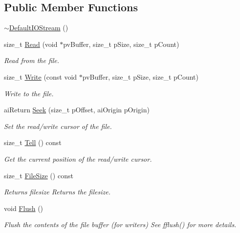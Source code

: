 \subsection*{Public Member Functions}
\begin{DoxyCompactItemize}
\item 
\hyperlink{class_assimp_1_1_default_i_o_stream_a650bf2643dd6e8bec2dea5d42d3dad87}{$\sim$\+Default\+I\+O\+Stream} ()
\item 
size\+\_\+t \hyperlink{class_assimp_1_1_default_i_o_stream_a155183c2c2ecc4d89a87acd0b8b4e9f6}{Read} (void $\ast$pv\+Buffer, size\+\_\+t p\+Size, size\+\_\+t p\+Count)
\begin{DoxyCompactList}\small\item\em Read from the file. \end{DoxyCompactList}\item 
size\+\_\+t \hyperlink{class_assimp_1_1_default_i_o_stream_aea9db55f57be5258d92fe7bf9a4e2023}{Write} (const void $\ast$pv\+Buffer, size\+\_\+t p\+Size, size\+\_\+t p\+Count)
\begin{DoxyCompactList}\small\item\em Write to the file. \end{DoxyCompactList}\item 
ai\+Return \hyperlink{class_assimp_1_1_default_i_o_stream_af00a478e5acde375ae048ac3a02fb856}{Seek} (size\+\_\+t p\+Offset, ai\+Origin p\+Origin)
\begin{DoxyCompactList}\small\item\em Set the read/write cursor of the file. \end{DoxyCompactList}\item 
size\+\_\+t \hyperlink{class_assimp_1_1_default_i_o_stream_a2be680b7e4b6d69f9838c8ddd0089913}{Tell} () const 
\begin{DoxyCompactList}\small\item\em Get the current position of the read/write cursor. \end{DoxyCompactList}\item 
\hypertarget{class_assimp_1_1_default_i_o_stream_a6613194345241f27157ef48230b8cf6a}{size\+\_\+t \hyperlink{class_assimp_1_1_default_i_o_stream_a6613194345241f27157ef48230b8cf6a}{File\+Size} () const }\label{class_assimp_1_1_default_i_o_stream_a6613194345241f27157ef48230b8cf6a}

\begin{DoxyCompactList}\small\item\em Returns filesize Returns the filesize. \end{DoxyCompactList}\item 
\hypertarget{class_assimp_1_1_default_i_o_stream_a8f5820f1157b5906b8f3a272616d7dda}{void \hyperlink{class_assimp_1_1_default_i_o_stream_a8f5820f1157b5906b8f3a272616d7dda}{Flush} ()}\label{class_assimp_1_1_default_i_o_stream_a8f5820f1157b5906b8f3a272616d7dda}

\begin{DoxyCompactList}\small\item\em Flush the contents of the file buffer (for writers) See fflush() for more details. \end{DoxyCompactList}\end{DoxyCompactItemize}
